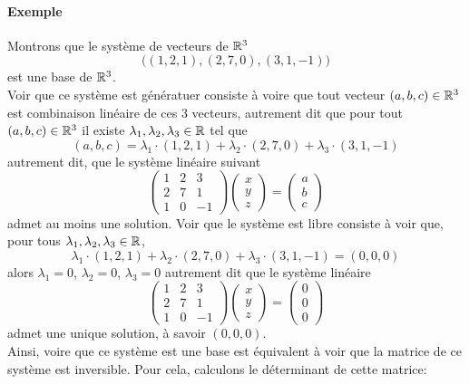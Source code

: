 \paragraph{Exemple} Montrons que le système de vecteurs de $\mathbb{R}^3$ 
$$\big( (1, 2, 1), (2, 7, 0), (3, 1, -1) \big)$$
est une base de $\mathbb{R}^3$. \\
Voir que ce système est génératuer consiste à voire que tout vecteur $(a, b, c) \in \mathbb{R}^3$ est combinaison linéaire de ces 3 vecteurs, autrement dit que pour tout $(a, b, c) \in \mathbb{R}^3$ il existe $\lambda_1, \lambda_2, \lambda_3 \in \mathbb{R}$ tel que 
$$(a, b, c) = \lambda_1 \cdot (1, 2, 1) +\lambda_2 \cdot (2, 7, 0) + \lambda_3 \cdot (3, 1, -1)$$
autrement dit, que le système linéaire suivant
$$\begin{pmatrix}
  1 & 2 & 3 \\
  2 & 7 & 1 \\
  1 & 0 & -1
\end{pmatrix}
\begin{pmatrix}
  x \\
  y \\
  z 
\end{pmatrix}
=
\begin{pmatrix}
  a \\
  b \\
  c
\end{pmatrix}$$
admet au moins une solution. Voir que le système est libre consiste à voir que, pour tous $\lambda_1, \lambda_2, \lambda_3 \in \mathbb{R}$, 
$$\lambda_1 \cdot (1, 2, 1) +\lambda_2 \cdot (2, 7, 0) + \lambda_3 \cdot (3, 1, -1) = (0, 0, 0)$$
alors $\lambda_1=0$, $\lambda_2=0$, $\lambda_3=0$ autrement dit que le système linéaire
$$\begin{pmatrix}
  1 & 2 & 3 \\
  2 & 7 & 1 \\
  1 & 0 & -1
\end{pmatrix}
\begin{pmatrix}
  x \\
  y \\
  z 
\end{pmatrix}
=
\begin{pmatrix}
  0 \\
  0 \\
  0
\end{pmatrix}$$
admet une unique solution, à savoir $(0, 0, 0)$. \\
Ainsi, voire que ce système est une base est équivalent à voir que la matrice de ce système est inversible. Pour cela, calculons le déterminant de cette matrice:

